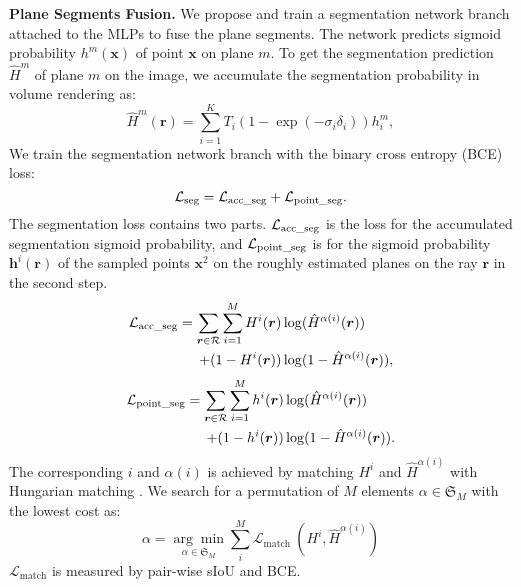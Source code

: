\documentclass[10pt,journal,compsoc]{IEEEtran}
\begin{document}
\noindent\textbf{Plane Segments Fusion.}
We propose and train a segmentation network branch attached to the MLPs to fuse the plane segments. The network predicts sigmoid probability $h^m(\bm{x})$ of point $\bm{x}$ on plane $m$. To get the segmentation prediction $\hat{H}^m$ of plane $m$ on the image, we accumulate the segmentation probability in volume rendering as:
\begin{equation}
	\hat{H}^m(\bm{r})=\sum_{i=1}^K T_i\left(1-\exp \left(-\sigma_i \delta_i\right)\right) h^m_i,
\end{equation}
We train the segmentation network branch with the binary cross entropy (BCE) loss:
\begin{equation}
	\notag\mathcal{L}_{\text{seg}} = \notag\mathcal{L}_{\text{acc\_seg}} + \notag\mathcal{L}_{\text{point\_seg}}.
\end{equation}
The segmentation loss contains two parts. $\notag\mathcal{L}_{\text{acc\_seg}}$ is the loss for the accumulated segmentation sigmoid probability, and $\notag\mathcal{L}_{\text{point\_seg}}$ is for the sigmoid probability $\mathbf{h}^i(\bm{r})$ of the sampled points $\bm{x}^2$ on the roughly estimated planes on the ray $\bm{r}$ in the second step.
\begin{align}
	\notag\mathcal{L}_{\text{acc\_seg}}=
	\sum_{\bm{r} \in \mathcal{R}} \sum_{i=1}^M H^i(\bm{r}) &\log(\hat{H}^{\alpha(i)}(\bm{r}))\\
	+ (1 - H^i(\bm{r})) & \log(1 - \hat{H}^{\alpha(i)}(\bm{r})),
\end{align}
\begin{align}
	\notag\mathcal{L}_{\text{point\_seg}}=
	\sum_{\bm{r} \in \mathcal{R}} \sum_{i=1}^M h^i(\bm{r}) &\log(\hat{H}^{\alpha(i)}(\bm{r}))\\
	+ (1 - h^i(\bm{r})) & \log(1 - \hat{H}^{\alpha(i)}(\bm{r})).
\end{align}
The corresponding $i$ and $\alpha(i)$ is achieved by matching $H^i$ and $\hat{H}^{\alpha(i)}$ with Hungarian matching \cite{kuhn1955hungarian,carion2020end,wang2022dm}. We search for a permutation of $M$ elements $\alpha \in \mathfrak{S}_M$ with the lowest cost as:
\begin{equation}
	\alpha=\underset{\alpha \in \mathfrak{S}_M}{\arg \min } \sum_i^M \mathcal{L}_{\text {match }}\left(H^i, \hat{H}^{\alpha(i)}\right)
\end{equation}
$\mathcal{L}_\text{match}$ is measured by pair-wise sIoU and BCE.
\end{document}
